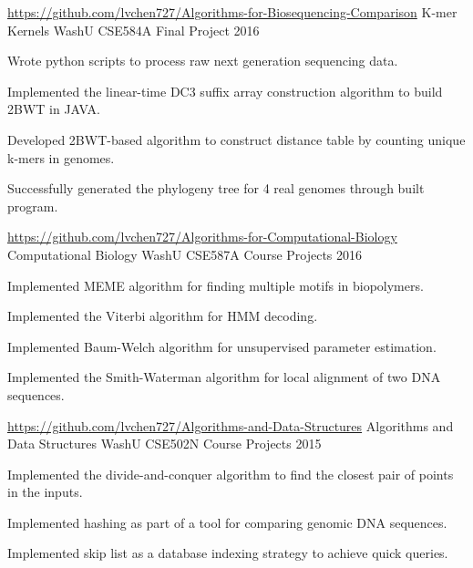 \begin{cventries}
 \cventry
  	{\url{https://github.com/lvchen727/Algorithms-for-Biosequencing-Comparison}} %
    {K-mer Kernels}%
    {WashU CSE584A Final Project} %
    {2016} %
    {
      \begin{cvitems} %
        \item{Wrote python scripts to process raw next generation sequencing data.}
        \item {Implemented the linear-time DC3 suffix array construction algorithm to build 2BWT in JAVA.}
        \item {Developed 2BWT-based algorithm to construct distance table by counting unique k-mers in genomes. }
        \item {Successfully generated the phylogeny tree for 4 real genomes through built program.}
      \end{cvitems}
    }
 \cventry
  	{\url{https://github.com/lvchen727/Algorithms-for-Computational-Biology}} %
    {Computational Biology}%
    {WashU CSE587A Course Projects} %
    {2016} %
    {
      \begin{cvitems} %
        \item{Implemented MEME algorithm for finding multiple motifs in biopolymers.}
        \item{Implemented the Viterbi algorithm for HMM decoding. }
        \item{Implemented Baum-Welch algorithm for unsupervised parameter estimation.}
        \item{Implemented the Smith-Waterman algorithm for local alignment of two DNA sequences.}
      \end{cvitems}
    }
 \cventry
  	{\url{https://github.com/lvchen727/Algorithms-and-Data-Structures}} %
    {Algorithms and Data Structures}%
    {WashU CSE502N Course Projects} %
    {2015} %
    {
      \begin{cvitems} %
        \item{Implemented the divide-and-conquer algorithm to find the closest pair of points in the inputs.}
        \item{Implemented hashing as part of a tool for comparing genomic DNA sequences. }
        \item{Implemented skip list as a database indexing strategy to achieve quick queries.}
      \end{cvitems}
    }


\end{cventries}
